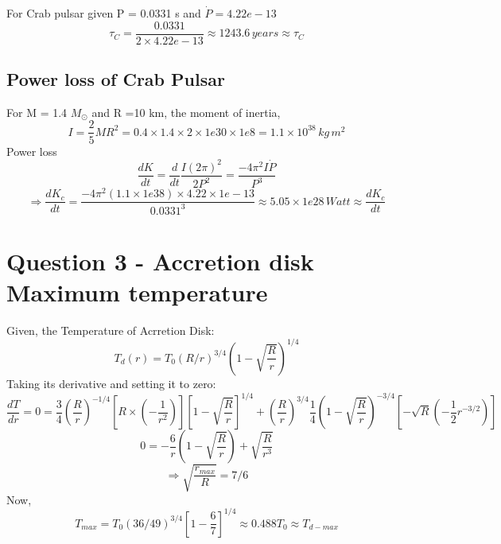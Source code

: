 \documentclass[11pt]{article}
\begin{document}
	For Crab pulsar given P = 0.0331 s and $\dot{P} = 4.22e-13$
	\[
		\tau_C = \frac{0.0331}{2 \times 4.22e-13} \approx \boxed{1243.6 \, years \approx \tau_C}
	\]
	
	\subsection{Power loss of Crab Pulsar}
	
	For M = 1.4 $M_\odot$ and R =10 km, the moment of inertia,
	\[
		I = \frac{2}{5}MR^2 = 0.4 \times 1.4 \times 2 \times 1e30 \times 1e8 = 1.1 \times 10^{38} \, kg \, m^2
	\]
	Power loss
	\[
		\frac{dK}{dt} = \frac{d}{dt} \frac{I(2\pi)^2}{2P^2} = \frac{-4\pi^2 I\dot{P}}{P^3}
	\]
	\[
		\Rightarrow \frac{dK_c}{dt} = \frac{-4\pi^2 (1.1 \times 1e38) \times 4.22 \times 1e-13}{0.0331^3} \approx \boxed{5.05 \times 1e28 \, Watt \approx \frac{dK_c}{dt}}
	\]
	
	\section{\color{teal} Question 3 - Accretion disk Maximum temperature}
	
	Given, the Temperature of Acrretion Disk:
	\[
		T_d(r) = T_0 (R/r)^{3/4}(1-\sqrt{\frac{R}{r}})^{1/4}
	\]
	Taking its derivative and setting it to zero:
	\[
		\frac{dT}{dr} = 0 = \frac{3}{4}(\frac{R}{r})^{-1/4}[R\times(-\frac{1}{r^2})][1-\sqrt{\frac{R}{r}}]^{1/4} + (\frac{R}{r})^{3/4}\frac{1}{4}(1-\sqrt{\frac{R}{r}})^{-3/4}[-\sqrt{R}(-\frac{1}{2}r^{-3/2})]
	\]
	\[
		0 = -\frac{6}{r}(1-\sqrt{\frac{R}{r}}) + \sqrt{\frac{R}{r^3}} 
	\]
	\[
		\Rightarrow \boxed{\sqrt{\frac{r_{max}}{R}} = 7/6}
	\]
	Now,
	\[
		T_{max} = T_0 (36/49)^{3/4}[1-\frac{6}{7}]^{1/4} \approx \boxed{0.488 T_0 \approx T_{d-max}}
	\] 
	
	
\end{document}
